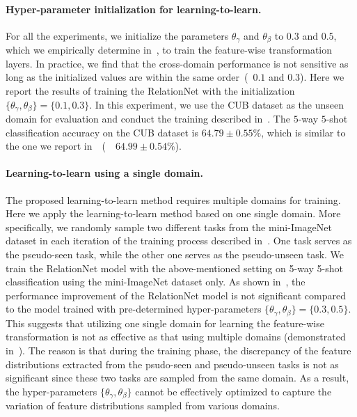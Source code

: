 \paragraph{Hyper-parameter initialization for learning-to-learn.}
For all the experiments, we initialize the parameters $\theta_\gamma$ and $\theta_\beta$ to $0.3$ and $0.5$, which we empirically determine in~, to train the feature-wise transformation layers. 
In practice, we find that the cross-domain performance is not sensitive as long as the initialized values are within the same order~(\eg~$0.1$ and $0.3$). 
Here we report the results of training the RelationNet with the initialization $\{\theta_\gamma,\theta_\beta\}=\{0.1,0.3\}$.
In this experiment, we use the CUB dataset as the unseen domain for evaluation and conduct the training described in~.
The $5$-way $5$-shot classification accuracy on the CUB dataset is $64.79\pm0.55\%$, which is similar to the one we report in~~(~\ie~$64.99 \pm 0.54\%$).


\paragraph{Learning-to-learn using a single domain.}
The proposed learning-to-learn method requires multiple domains for training.
Here we apply the learning-to-learn method based on one single domain.
More specifically, we randomly sample two different tasks from the mini-ImageNet dataset in each iteration of the training process described in~. 
One task serves as the pseudo-seen task, while the other one serves as the pseudo-unseen task.
We train the RelationNet model with the above-mentioned setting on 5-way 5-shot classification using the mini-ImageNet dataset only. 
As shown in~, the performance improvement of the RelationNet model is not significant compared to the model trained with pre-determined hyper-parameters $\{\theta_\gamma,\theta_\beta\}=\{0.3,0.5\}$.
This suggests that utilizing one single domain for learning the feature-wise transformation is not as effective as that using multiple domains (demonstrated in~).
The reason is that during the training phase, the discrepancy of the feature distributions extracted from the psudo-seen and pseudo-unseen tasks is not as significant since these two tasks are sampled from the same domain.
As a result, the hyper-parameters $\{\theta_\gamma,\theta_\beta\}$ cannot be effectively optimized to capture the variation of feature distributions sampled from various domains.

